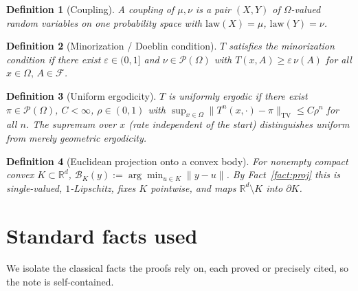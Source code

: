 \documentclass[11pt]{article}
\theoremstyle{definitionbreak}
\newtheorem{definition}{Definition}[section]
\theoremstyle{plainbreak}
\theoremstyle{remarkbreak}
\newcommand{\R}{\mathbb{R}}
\newcommand{\cF}{\mathcal{F}}
\newcommand{\cP}{\mathcal{P}}
\newcommand{\Om}{\Omega}
\newcommand{\TV}{\mathrm{TV}}
\newcommand{\norm}[1]{\lVert #1 \rVert}
\begin{document}
\begin{definition}[Coupling]
\label{def:coupling}
A \emph{coupling} of $\mu,\nu$ is a pair $(X,Y)$ of $\Om$-valued random variables on one probability
space with $\mathrm{law}(X)=\mu$, $\mathrm{law}(Y)=\nu$.
\end{definition}

\begin{definition}[Minorization / Doeblin condition]
\label{def:minor}
$T$ satisfies the \emph{minorization condition} if there exist $\varepsilon\in(0,1]$ and
$\nu\in\cP(\Om)$ with $T(x,A)\ge\varepsilon\,\nu(A)$ for all $x\in\Om,\,A\in\cF$.
\end{definition}

\begin{definition}[Uniform ergodicity]
\label{def:unifergodic}
$T$ is \emph{uniformly ergodic} if there exist $\pi\in\cP(\Om)$, $C<\infty$, $\rho\in(0,1)$ with
$\sup_{x\in\Om}\norm{T^n(x,\cdot)-\pi}_\TV\le C\rho^n$ for all $n$. The supremum over $x$ (rate
independent of the start) distinguishes \emph{uniform} from merely geometric ergodicity.
\end{definition}

\begin{definition}[Euclidean projection onto a convex body]
\label{def:proj}
For nonempty compact convex $K\subset\R^d$, $\mathcal B_K(y):=\arg\min_{u\in K}\norm{y-u}$.
By Fact~\ref{fact:proj} this is single-valued, $1$-Lipschitz, fixes $K$ pointwise, and maps
$\R^d\setminus K$ into $\partial K$.
\end{definition}

\section{Standard facts used}
\label{sec:facts}

We isolate the classical facts the proofs rely on, each proved or precisely cited, so the note is
self-contained.
\end{document}
